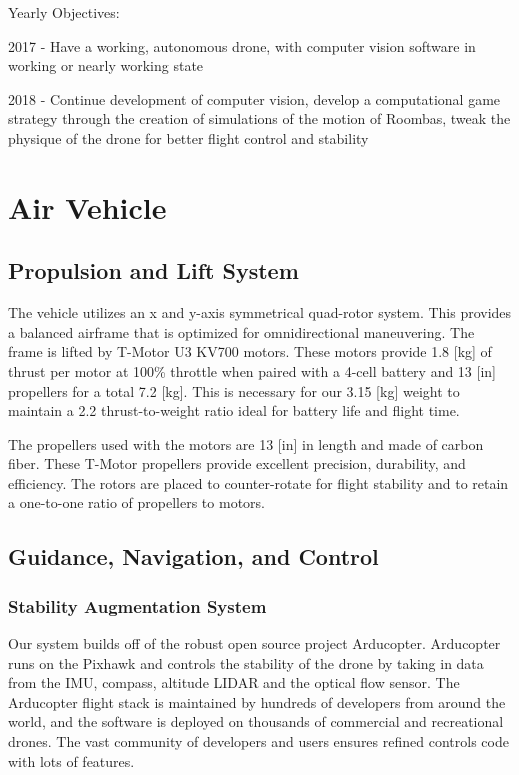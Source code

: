 \documentclass[12pt,letterpaper]{article}
\begin{document}
	Yearly Objectives:

	2017 - Have a working, autonomous drone, with computer vision software in working or nearly working state

	2018 - Continue development of computer vision, develop a computational game strategy through the creation of simulations of the motion of Roombas, tweak the physique of the drone for better flight control and stability

\section*{Air Vehicle}
	\subsection*{Propulsion and Lift System}
		The vehicle utilizes an x and y-axis symmetrical quad-rotor system. This provides a balanced airframe that is optimized for omnidirectional maneuvering. The frame is lifted by T-Motor U3 KV700 motors. These motors provide 1.8 [kg] of thrust per motor at 100\% throttle when paired with a 4-cell battery and 13 [in] propellers for a total 7.2 [kg]. This is necessary for our 3.15 [kg] weight to maintain a 2.2 thrust-to-weight ratio ideal for battery life and flight time.

		The propellers used with the motors are 13 [in] in length and made of carbon fiber. These T-Motor propellers provide excellent precision, durability, and efficiency. The rotors are placed to counter-rotate for flight stability and to retain a one-to-one ratio of propellers to motors.

	\subsection*{Guidance, Navigation, and Control}
		\subsubsection*{Stability Augmentation System}
			Our system builds off of the robust open source project Arducopter. Arducopter runs on the Pixhawk and controls the stability of the drone by taking in data from the IMU, compass, altitude LIDAR and the optical flow sensor. The Arducopter flight stack is maintained by hundreds of developers from around the world, and the software is deployed on thousands of commercial and recreational drones. The vast community of developers and users ensures refined controls code with lots of features.
\end{document}
